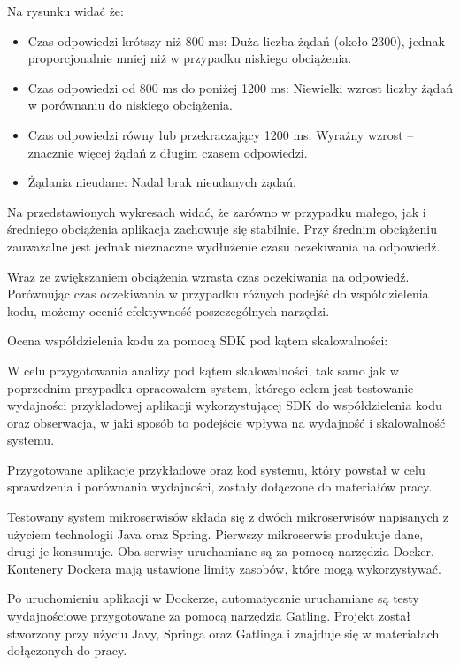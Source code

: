 \documentclass[runningheads,12pt]{llncs}
\begin{document}
Na rysunku widać że:

\begin{itemize}
    \item Czas odpowiedzi krótszy niż 800 ms: Duża liczba żądań (około 2300), jednak proporcjonalnie mniej niż w przypadku niskiego obciążenia.
    \item Czas odpowiedzi od 800 ms do poniżej 1200 ms: Niewielki wzrost liczby żądań w porównaniu do niskiego obciążenia.
    \item Czas odpowiedzi równy lub przekraczający 1200 ms: Wyraźny wzrost – znacznie więcej żądań z długim czasem odpowiedzi.
    \item Żądania nieudane: Nadal brak nieudanych żądań.
\end{itemize}

Na przedstawionych wykresach widać, że zarówno w przypadku małego, jak i średniego obciążenia aplikacja zachowuje się stabilnie. Przy średnim obciążeniu zauważalne jest jednak nieznaczne wydłużenie czasu oczekiwania na odpowiedź.

\newpage

Wraz ze zwiększaniem obciążenia wzrasta czas oczekiwania na odpowiedź. Porównując czas oczekiwania w przypadku różnych podejść do współdzielenia kodu, możemy ocenić efektywność poszczególnych narzędzi.

Ocena współdzielenia kodu za pomocą SDK pod kątem skalowalności:

W celu przygotowania analizy pod kątem skalowalności, tak samo jak w poprzednim przypadku opracowałem system, którego celem jest testowanie wydajności przykładowej aplikacji wykorzystującej SDK do współdzielenia kodu oraz obserwacja, w jaki sposób to podejście wpływa na wydajność i skalowalność systemu.

Przygotowane aplikacje przykładowe oraz kod systemu, który powstał w celu sprawdzenia i porównania wydajności, zostały dołączone do materiałów pracy.

Testowany system mikroserwisów składa się z dwóch mikroserwisów napisanych z użyciem technologii Java oraz Spring. Pierwszy mikroserwis produkuje dane, drugi je konsumuje. Oba serwisy uruchamiane są za pomocą narzędzia Docker. Kontenery Dockera mają ustawione limity zasobów, które mogą wykorzystywać.

Po uruchomieniu aplikacji w Dockerze, automatycznie uruchamiane są testy wydajnościowe przygotowane za pomocą narzędzia Gatling. Projekt został stworzony przy użyciu Javy, Springa oraz Gatlinga i znajduje się w materiałach dołączonych do pracy.
\end{document}
